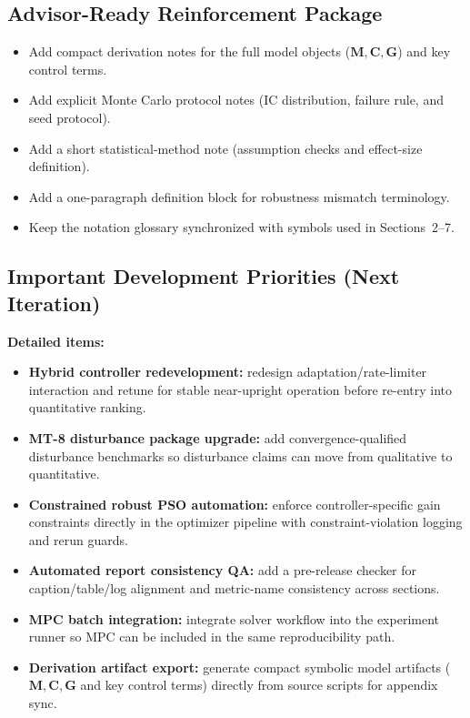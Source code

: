 \documentclass[10pt, a4paper]{article}
\begin{document}
\subsection{Advisor-Ready Reinforcement Package}
\begin{itemize}[leftmargin=1.5em,itemsep=0.25em]
  \item Add compact derivation notes for the full model objects
  ($\mathbf{M}, \mathbf{C}, \mathbf{G}$) and key control terms.
  \item Add explicit Monte Carlo protocol notes (IC distribution, failure rule,
  and seed protocol).
  \item Add a short statistical-method note (assumption checks and
  effect-size definition).
  \item Add a one-paragraph definition block for robustness mismatch terminology.
  \item Keep the notation glossary synchronized with symbols used in
  Sections~2--7.
\end{itemize}

\subsection{Important Development Priorities (Next Iteration)}
\noindent\textbf{Detailed items:}
\begin{itemize}[leftmargin=1.5em,itemsep=0.25em]
  \item \textbf{Hybrid controller redevelopment:} redesign adaptation/rate-limiter
  interaction and retune for stable near-upright operation before re-entry into
  quantitative ranking.
  \item \textbf{MT-8 disturbance package upgrade:} add convergence-qualified
  disturbance benchmarks so disturbance claims can move from qualitative to
  quantitative.
  \item \textbf{Constrained robust PSO automation:} enforce controller-specific
  gain constraints directly in the optimizer pipeline with constraint-violation
  logging and rerun guards.
  \item \textbf{Automated report consistency QA:} add a pre-release checker for
  caption/table/log alignment and metric-name consistency across sections.
  \item \textbf{MPC batch integration:} integrate solver workflow into the
  experiment runner so MPC can be included in the same reproducibility path.
  \item \textbf{Derivation artifact export:} generate compact symbolic model
  artifacts ($\mathbf{M},\mathbf{C},\mathbf{G}$ and key control terms) directly
  from source scripts for appendix sync.
\end{itemize}
\end{document}
